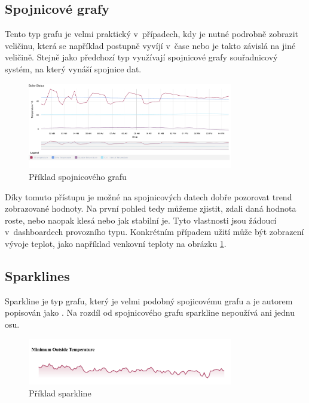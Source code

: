 
\subsection*{Spojnicové  grafy}
Tento typ grafu je velmi praktický v~případech, kdy je nutné podrobně zobrazit veličinu, která se například postupně vyvíjí v~čase nebo je takto závislá na jiné veličině. Stejně jako předchozí typ využívají spojnicové grafy souřadnicový systém, na který vynáší spojnice dat. 
\begin{figure}[H]
\label{line}
\begin{center}
    \includegraphics[width=0.8\textwidth]{obrazky-figures/line.pdf}
\end{center}
\caption{Příklad spojnicového grafu}
\end{figure}
Díky tomuto přístupu je možné na spojnicových datech dobře pozorovat trend zobrazované hodnoty. Na první pohled tedy můžeme zjistit, zdali daná hodnota roste, nebo naopak klesá nebo jak stabilní je. Tyto vlastnosti jsou žádoucí v~dashboardech provozního typu. Konkrétním případem užití může být zobrazení vývoje teplot, jako například venkovní teploty na obrázku \ref{line}.

\subsection*{Sparklines}
Sparkline je typ grafu, který je velmi podobný spojicovému grafu a je autorem popisován jako  \cite{tufte_2006}. Na rozdíl od spojnicového grafu sparkline nepoužívá ani jednu osu. 

\begin{figure}[H]
\label{sparkline}
\begin{center}
    \includegraphics[width=0.8\textwidth]{obrazky-figures/sparkline.pdf}
\end{center}
\caption{Příklad sparkline}
\end{figure}

